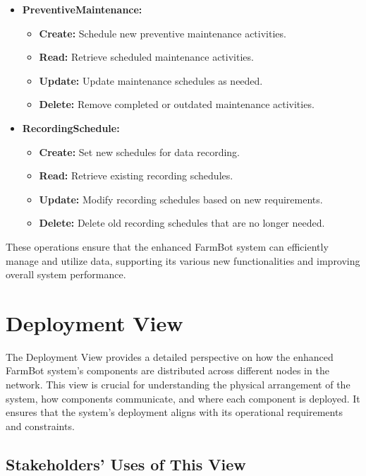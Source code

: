 \begin{itemize}
    \item \textbf{PreventiveMaintenance:}
    \begin{itemize}
        \item \textbf{Create:} Schedule new preventive maintenance activities.
        \item \textbf{Read:} Retrieve scheduled maintenance activities.
        \item \textbf{Update:} Update maintenance schedules as needed.
        \item \textbf{Delete:} Remove completed or outdated maintenance activities.
    \end{itemize}

    \item \textbf{RecordingSchedule:}
    \begin{itemize}
        \item \textbf{Create:} Set new schedules for data recording.
        \item \textbf{Read:} Retrieve existing recording schedules.
        \item \textbf{Update:} Modify recording schedules based on new requirements.
        \item \textbf{Delete:} Delete old recording schedules that are no longer needed.
    \end{itemize}
\end{itemize}

These operations ensure that the enhanced FarmBot system can efficiently manage and utilize data, supporting its various new functionalities and improving overall system performance.




\section{Deployment View}

The Deployment View provides a detailed perspective on how the enhanced FarmBot system's components are distributed across different nodes in the network. This view is crucial for understanding the physical arrangement of the system, how components communicate, and where each component is deployed. It ensures that the system's deployment aligns with its operational requirements and constraints.

\subsection{Stakeholders’ Uses of This View}

